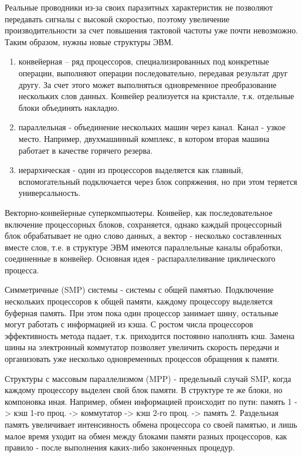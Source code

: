 \documentclass[unicode, 12pt, a4paper, oneside]{article}
\begin{document}
Реальные проводники из-за своих паразитных характеристик не позволяют передавать сигналы с высокой скоростью, поэтому увеличение производительности за счет повышения тактовой частоты уже почти невозможно. Таким образом, нужны новые структуры ЭВМ.
\begin{enumerate}
\item конвейерная – ряд процессоров, специализированных под конкретные операции, выполняют операции последовательно, передавая результат друг другу. За счет этого может выполняться одновременное преобразование нескольких слов данных. Конвейер реализуется на кристалле, т.к. отдельные блоки объединять накладно.
\item параллельная - объединение нескольких машин через канал. Канал - узкое место. Например, двухмашинный комплекс, в котором вторая машина работает в качестве горячего резерва.
\item иерархическая - один из процессоров выделяется как главный, вспомогательный подключается через блок сопряжения, но при этом теряется универсальность.
\end{enumerate}

Векторно-конвейерные суперкомпьютеры. Конвейер, как последовательное включение процессорных блоков, сохраняется, однако каждый процессорный блок обрабатывает не одно слово данных, а вектор - несколько составленных вместе слов, т.е. в структуре ЭВМ имеются параллельные каналы обработки, соединенные в конвейер. Основная идея - распараллеливание циклического процесса.

Симметричные (SMP) системы - системы с общей памятью. Подключение нескольких процессоров к общей памяти, каждому процессору выделяется буферная память. При этом пока один процессор занимает шину, остальные могут работать с информацией из кэша. С ростом числа процессоров эффективность метода падает, т.к. приходится постоянно наполнять кэш. Замена шины на электронный коммутатор позволяет увеличить скорость передачи и организовать уже несколько одновременных процессов обращения к памяти. 

Структуры с массовым параллелизмом (MPP) - предельный случай SMP, когда каждому процессору выделен свой блок памяти. В структуре те же блоки, но компоновка иная. Например, обмен информацией происходит по пути: память 1 -> кэш 1-го проц. -> коммутатор -> кэш 2-го проц. -> память 2. Раздельная память увеличивает интенсивность обмена процессора со своей памятью, и лишь малое время уходит на обмен между блоками памяти разных процессоров, как правило - после выполнения каких-либо законченных процедур.
\end{document}

